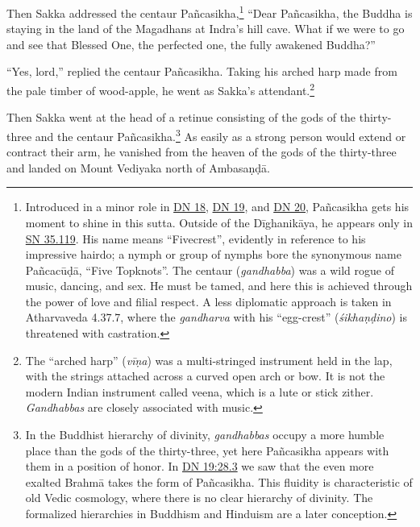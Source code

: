 \documentclass[12pt,openany]{book}%
\begin{document}
Then Sakka addressed the centaur \textsanskrit{Pañcasikha},\footnote{Introduced in a minor role in \href{https://suttacentral.net/dn18/en/sujato}{DN 18}, \href{https://suttacentral.net/dn19/en/sujato}{DN 19}, and \href{https://suttacentral.net/dn20/en/sujato}{DN 20}, \textsanskrit{Pañcasikha} gets his moment to shine in this sutta. Outside of the \textsanskrit{Dīghanikāya}, he appears only in \href{https://suttacentral.net/sn35.119/en/sujato}{SN 35.119}. His name means “Fivecrest”, evidently in reference to his impressive hairdo; a nymph or group of nymphs bore the synonymous name \textsanskrit{Pañcacūḍā}, “Five Topknots”. The centaur (\textit{gandhabba}) was a wild rogue of music, dancing, and sex. He must be tamed, and here this is achieved through the power of love and filial respect. A less diplomatic approach is taken in Atharvaveda 4.37.7, where the \textit{gandharva} with his “egg-crest” (\textit{\textsanskrit{śikhaṇḍino}}) is threatened with castration. } “Dear \textsanskrit{Pañcasikha}, the Buddha is staying in the land of the Magadhans at Indra’s hill cave. What if we were to go and see that Blessed One, the perfected one, the fully awakened Buddha?” 

“Yes, lord,” replied the centaur \textsanskrit{Pañcasikha}. Taking his arched harp made from the pale timber of wood-apple, he went as Sakka’s attendant.\footnote{The “arched harp” (\textit{\textsanskrit{vīṇa}}) was a multi-stringed instrument held in the lap, with the strings attached across a curved open arch or bow. It is not the modern Indian instrument called veena, which is a lute or stick zither. \textit{Gandhabbas} are closely associated with music. } 

Then Sakka went at the head of a retinue consisting of the gods of the thirty-three and the centaur \textsanskrit{Pañcasikha}.\footnote{In the Buddhist hierarchy of divinity, \textit{gandhabbas} occupy a more humble place than the gods of the thirty-three, yet here \textsanskrit{Pañcasikha} appears with them in a position of honor. In \href{https://suttacentral.net/dn19/en/sujato\#28.3}{DN 19:28.3} we saw that the even more exalted \textsanskrit{Brahmā} takes the form of \textsanskrit{Pañcasikha}. This fluidity is characteristic of old Vedic cosmology, where there is no clear hierarchy of divinity. The formalized hierarchies in Buddhism and Hinduism are a later conception. } As easily as a strong person would extend or contract their arm, he vanished from the heaven of the gods of the thirty-three and landed on Mount Vediyaka north of \textsanskrit{Ambasaṇḍā}. 
\end{document}
